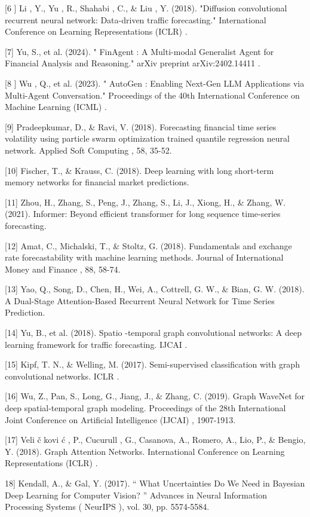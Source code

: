 \documentclass[10pt,a4paper]{article}
\begin{document}
[6 ] Li , Y., Yu , R., Shahabi , C., \& Liu , Y. (2018). "Diffusion convolutional recurrent neural network: Data-driven traffic forecasting." International Conference on Learning Representations (ICLR) .

[7] Yu, S., et al. (2024). " FinAgent : A Multi-modal Generalist Agent for Financial Analysis and Reasoning." arXiv preprint arXiv:2402.14411 .

[8 ] Wu , Q., et al. (2023). " AutoGen : Enabling Next-Gen LLM Applications via Multi-Agent Conversation." Proceedings of the 40th International Conference on Machine Learning (ICML) .

[9] Pradeepkumar, D., \& Ravi, V. (2018). Forecasting financial time series volatility using particle swarm optimization trained quantile regression neural network. Applied Soft Computing , 58, 35-52.

[10] Fischer, T., \& Krauss, C. (2018). Deep learning with long short-term memory networks for financial market predictions.

[11] Zhou, H., Zhang, S., Peng, J., Zhang, S., Li, J., Xiong, H., \& Zhang, W. (2021). Informer: Beyond efficient transformer for long sequence time-series forecasting.

[12] Amat, C., Michalski, T., \& Stoltz, G. (2018). Fundamentals and exchange rate forecastability with machine learning methods. Journal of International Money and Finance , 88, 58-74.

[13] Yao, Q., Song, D., Chen, H., Wei, A., Cottrell, G. W., \& Bian, G. W. (2018). A Dual-Stage Attention-Based Recurrent Neural Network for Time Series Prediction.

[14] Yu, B., et al. (2018). Spatio -temporal graph convolutional networks: A deep learning framework for traffic forecasting. IJCAI .

[15] Kipf, T. N., \& Welling, M. (2017). Semi-supervised classification with graph convolutional networks. ICLR .

[16] Wu, Z., Pan, S., Long, G., Jiang, J., \& Zhang, C. (2019). Graph WaveNet for deep spatial-temporal graph modeling. Proceedings of the 28th International Joint Conference on Artificial Intelligence (IJCAI) , 1907-1913.

[17] Veli č kovi ć , P., Cucurull , G., Casanova, A., Romero, A., Lio, P., \& Bengio, Y. (2018). Graph Attention Networks. International Conference on Learning Representations (ICLR) .

18] Kendall, A., \& Gal, Y. (2017). “ What Uncertainties Do We Need in Bayesian Deep Learning for Computer Vision? ” Advances in Neural Information Processing Systems ( NeurIPS ), vol. 30, pp. 5574-5584.
\end{document}
